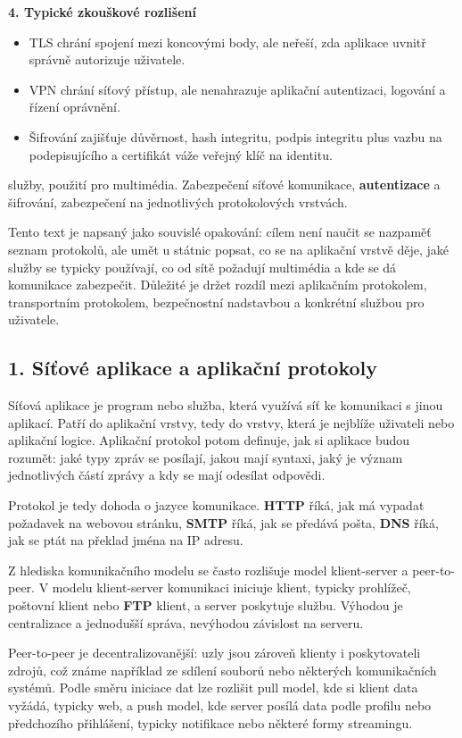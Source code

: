 \documentclass[11pt,a4paper]{article}
\begin{document}
\textbf{4. Typické zkouškové rozlišení}
\begin{itemize}
  \item TLS chrání spojení mezi koncovými body, ale neřeší, zda aplikace uvnitř správně autorizuje uživatele.
  \item VPN chrání síťový přístup, ale nenahrazuje aplikační autentizaci, logování a řízení oprávnění.
  \item Šifrování zajišťuje důvěrnost, hash integritu, podpis integritu plus vazbu na podepisujícího a certifikát váže veřejný klíč na identitu.
\end{itemize}

služby, použití pro multimédia. Zabezpečení síťové komunikace, \textbf{autentizace} a šifrování, zabezpečení na jednotlivých protokolových vrstvách.

Tento text je napsaný jako souvislé opakování: cílem není naučit se nazpaměť seznam protokolů, ale umět u státnic popsat, co se na aplikační vrstvě děje, jaké služby se typicky používají, co od sítě požadují multimédia a kde se dá komunikace zabezpečit. Důležité je držet rozdíl mezi aplikačním protokolem, transportním protokolem, bezpečnostní nadstavbou a konkrétní službou pro uživatele.

\subsection*{1. Síťové aplikace a aplikační protokoly}

Síťová aplikace je program nebo služba, která využívá síť ke komunikaci s jinou aplikací. Patří do aplikační vrstvy, tedy do vrstvy, která je nejblíže uživateli nebo aplikační logice. Aplikační protokol potom definuje, jak si aplikace budou rozumět: jaké typy zpráv se posílají, jakou mají syntaxi, jaký je význam jednotlivých částí zprávy a kdy se mají odesílat odpovědi.

Protokol je tedy dohoda o jazyce komunikace. \textbf{HTTP} říká, jak má vypadat požadavek na webovou stránku, \textbf{SMTP} říká, jak se předává pošta, \textbf{DNS} říká, jak se ptát na překlad jména na IP adresu.

Z hlediska komunikačního modelu se často rozlišuje model klient-server a peer-to-peer. V modelu klient-server komunikaci iniciuje klient, typicky prohlížeč, poštovní klient nebo \textbf{FTP} klient, a server poskytuje službu. Výhodou je centralizace a jednodušší správa, nevýhodou závislost na serveru.

Peer-to-peer je decentralizovanější: uzly jsou zároveň klienty i poskytovateli zdrojů, což známe například ze sdílení souborů nebo některých komunikačních systémů. Podle směru iniciace dat lze rozlišit pull model, kde si klient data vyžádá, typicky web, a push model, kde server posílá data podle profilu nebo předchozího přihlášení, typicky notifikace nebo některé formy streamingu.
\end{document}
